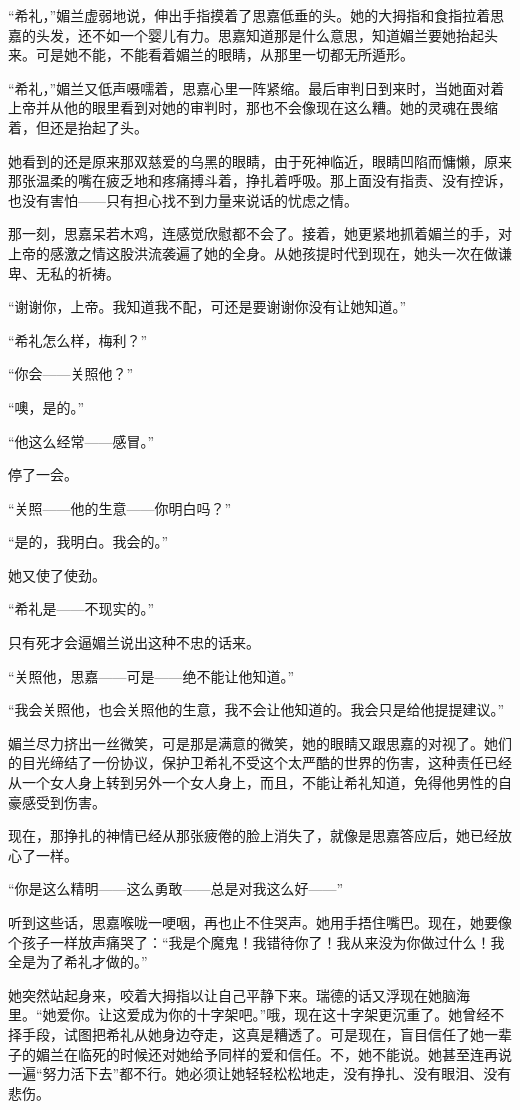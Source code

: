 \par “希礼，”媚兰虚弱地说，伸出手指摸着了思嘉低垂的头。她的大拇指和食指拉着思嘉的头发，还不如一个婴儿有力。思嘉知道那是什么意思，知道媚兰要她抬起头来。可是她不能，不能看着媚兰的眼睛，从那里一切都无所遁形。
\par “希礼，”媚兰又低声嗫嚅着，思嘉心里一阵紧缩。最后审判日到来时，当她面对着上帝并从他的眼里看到对她的审判时，那也不会像现在这么糟。她的灵魂在畏缩着，但还是抬起了头。
\par 她看到的还是原来那双慈爱的乌黑的眼睛，由于死神临近，眼睛凹陷而慵懒，原来那张温柔的嘴在疲乏地和疼痛搏斗着，挣扎着呼吸。那上面没有指责、没有控诉，也没有害怕——只有担心找不到力量来说话的忧虑之情。
\par 那一刻，思嘉呆若木鸡，连感觉欣慰都不会了。接着，她更紧地抓着媚兰的手，对上帝的感激之情这股洪流袭遍了她的全身。从她孩提时代到现在，她头一次在做谦卑、无私的祈祷。
\par “谢谢你，上帝。我知道我不配，可还是要谢谢你没有让她知道。”
\par “希礼怎么样，梅利？”
\par “你会——关照他？”
\par “噢，是的。”
\par “他这么经常——感冒。”
\par 停了一会。
\par “关照——他的生意——你明白吗？”
\par “是的，我明白。我会的。”
\par 她又使了使劲。
\par “希礼是——不现实的。”
\par 只有死才会逼媚兰说出这种不忠的话来。
\par “关照他，思嘉——可是——绝不能让他知道。”
\par “我会关照他，也会关照他的生意，我不会让他知道的。我会只是给他提提建议。”
\par 媚兰尽力挤出一丝微笑，可是那是满意的微笑，她的眼睛又跟思嘉的对视了。她们的目光缔结了一份协议，保护卫希礼不受这个太严酷的世界的伤害，这种责任已经从一个女人身上转到另外一个女人身上，而且，不能让希礼知道，免得他男性的自豪感受到伤害。
\par 现在，那挣扎的神情已经从那张疲倦的脸上消失了，就像是思嘉答应后，她已经放心了一样。
\par “你是这么精明——这么勇敢——总是对我这么好——”
\par 听到这些话，思嘉喉咙一哽咽，再也止不住哭声。她用手捂住嘴巴。现在，她要像个孩子一样放声痛哭了：“我是个魔鬼！我错待你了！我从来没为你做过什么！我全是为了希礼才做的。”
\par 她突然站起身来，咬着大拇指以让自己平静下来。瑞德的话又浮现在她脑海里。“她爱你。让这爱成为你的十字架吧。”哦，现在这十字架更沉重了。她曾经不择手段，试图把希礼从她身边夺走，这真是糟透了。可是现在，盲目信任了她一辈子的媚兰在临死的时候还对她给予同样的爱和信任。不，她不能说。她甚至连再说一遍“努力活下去”都不行。她必须让她轻轻松松地走，没有挣扎、没有眼泪、没有悲伤。
